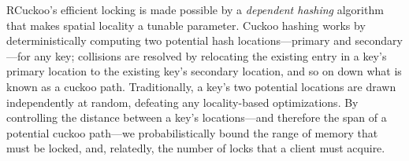 RCuckoo's efficient locking is made possible by a \emph{dependent
hashing} algorithm that makes spatial locality a tunable parameter.
Cuckoo hashing works by deterministically computing two potential hash
locations---primary and secondary---for any key; collisions are
resolved by relocating the existing entry in a key's primary location
to the existing key's secondary location, and so on down what is known
as a cuckoo path.  Traditionally, a key's two potential locations are
drawn independently at random, defeating any locality-based
optimizations.  By controlling the distance between a key's
locations---and therefore the span of a potential cuckoo path---we
probabilistically bound the range of memory that must be locked, and,
relatedly, the number of locks that a client must acquire.





